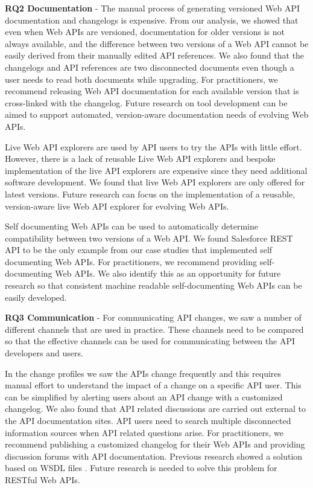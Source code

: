 \documentclass[conference]{IEEEtran}
\begin{document}
\textbf{RQ2 Documentation} - The manual process of generating versioned Web API documentation and changelogs is expensive. From our analysis, we showed that even when Web APIs are  versioned, documentation for older versions is not always available, and the difference between two versions of a Web API cannot be easily derived from their manually edited API references. We also found that the changelogs and API references are two disconnected documents even though a user needs to read both documents while upgrading. For practitioners, we recommend releasing Web API documentation for each available version that is cross-linked with the changelog. Future research on tool development can be aimed to support automated, version-aware documentation needs of evolving Web APIs.

Live Web API explorers are used by API users to try the APIs with little effort. However, there is a lack of reusable Live Web API explorers and bespoke implementation of the live API explorers are expensive since they need additional software development. We found that live Web API explorers are only offered for latest versions. Future research can focus on the implementation of a reusable, version-aware live Web API explorer for evolving Web APIs.

Self documenting Web APIs can be used to automatically determine compatibility between two versions of a Web API. We found Salesforce REST API to be the only example from our case studies that implemented self documenting Web APIs. For practitioners, we recommend providing self-documenting Web APIs. We also identify this as an opportunity for future research so that consistent machine readable self-documenting Web APIs can be easily developed.

\textbf{RQ3 Communication} - For communicating API changes, we saw a number of different channels that are used in practice. These channels need to be compared so that the effective channels can be used for communicating between the API developers and users.

In the change profiles we saw the APIs change frequently and this requires manual effort to understand the impact of a change on a specific API user. This can be simplified by alerting users about an API change with a customized changelog. We also found that API related discussions are carried out external to the API documentation sites. API users need to search multiple disconnected information sources when API related questions arise. For practitioners, we recommend publishing a customized changelog for their Web APIs and providing discussion forums with API documentation. Previous research showed a solution based on WSDL files \cite{le2008synchronizing}. Future research is needed to solve this problem for RESTful Web APIs.
\end{document}
